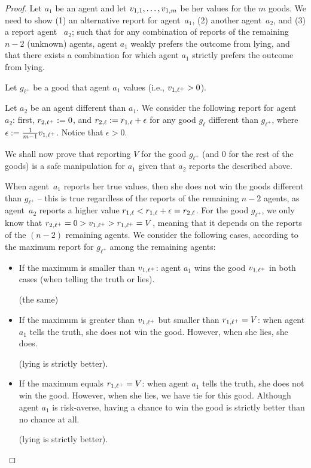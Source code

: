 \begin{proof}
    Let $a_1$ be an agent and let $v_{1,1}, \ldots, v_{1,m}$ be her values for the $m$ goods.
    We need to show (1) an alternative report for agent~$a_1$, (2) another agent~$a_2$, and (3) a report agent ~$a_2$; such that 
    for any combination of reports of the remaining $n-2$ (unknown) agents, agent $a_1$ weakly prefers the outcome from lying, and that there exists a combination for which agent $a_1$ strictly prefers the outcome from lying.

    Let $g_{\ell^+}$ be a good that agent $a_1$ values (i.e., $v_{1,\ell^+} >0$).
    
    Let $a_2$ be an agent different than $a_1$.
    We consider the following report for agent~$a_2$: first, $r_{2,\ell^+} :=0$, and $r_{2,\ell} := r_{1,\ell} + \epsilon$ for any good $g_{\ell}$ different than $g_{\ell^+}$, where $\epsilon := \frac{1}{m-1} v_{1,\ell^+} $.
    Notice that $\epsilon >0$.

    We shall now prove that reporting $V$ for the good $g_{\ell^+}$ (and $0$ for the rest of the goods) is a safe manipulation for $a_1$ given that $a_2$ reports the described above.

    When agent~$a_1$ reports her true values, then she does not win the goods different than $g_{\ell^+}$ -- this is true regardless of the reports of the remaining $n-2$ agents, as agent~$a_2$ reports a higher value $r_{1,\ell} < r_{1,\ell} + \epsilon = r_{2,\ell}$.
    For the good $g_{\ell^+}$,  we only know that $r_{2,\ell^+} = 0 > v_{1,\ell^+} > r_{1,\ell^+} = V$, meaning that it depends on the reports of the $(n-2)$ remaining agents. 
    We consider the following cases, according to the maximum report for $g_{\ell^+}$ among the remaining agents:
    \begin{itemize}
        \item If the maximum is smaller than $v_{1,\ell^+}$: agent $a_1$ wins the good $v_{1,\ell^+}$ in both cases (when telling the truth or lies). 

        (the same)

        \item If the maximum is greater than $v_{1,\ell^+}$ but smaller than $r_{1,\ell^+} = V$: when agent $a_1$ tells the truth, she does not win the good. 
        However, when she lies, she does.
        
        (lying is strictly better). 

        \item If the maximum equals $r_{1,\ell^+} = V$: when agent $a_1$ tells the truth, she does not win the good. 
        However, when she lies, we have tie for this good.
        Although agent $a_1$ is risk-averse, having a chance to win the good is strictly better than no chance at all.
        
        (lying is strictly better). 
    \end{itemize}
    
    
\end{proof}


